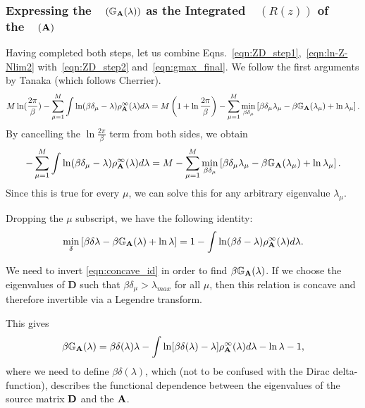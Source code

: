 \subsubsection{Expressing the~\GEN~$(\mathbb{G}_{\mathbf{A}}(\lambda))$ as the Integrated~\RTransform~$(R(z))$ of the~\CorrelationMatrix~$(\mathbf{A})$}
\label{sxn:tanaka_end}
Having completed both steps, let us combine Eqns.~\ref{eqn:ZD_step1},~\ref{eqn:ln-Z-Nlim2}
with~\ref{eqn:ZD_step2} and~\ref{eqn:gmax_final}.
We follow the first arguments by Tanaka\cite{Tanaka2007} (which follows Cherrier\cite{Cherrier2003}).
\begin{align}
   M\ln(\dfrac{{2}\pi}{\beta})-\sum_{\mu=1}^{M}\int \ln(\beta\delta_{\mu}-\lambda)\rho^{\infty}_{\mathbf{A}}(\lambda)d\lambda
      = M \left( 1 + \ln \frac{2\pi}{\beta} \right) - \sum_{\mu=1}^{M} \min_{\beta\delta_{\mu}} \left[\beta\delta_{\mu}\lambda_{\mu}
      - \beta\mathbb{G}_{\mathbf{A}}(\lambda_{\mu}) + \ln \lambda_{\mu} \right]   .
\end{align}
By cancelling the $\ln \frac{2\pi}{\beta}$ term from both sides, we obtain
\begin{align}
   -\sum_{\mu=1}^{M}\int \ln(\beta\delta_{\mu}-\lambda)\rho^{\infty}_{\mathbf{A}}(\lambda)d\lambda
   =
   M - \sum_{\mu=1}^{M} \min_{\beta\delta_{\mu}} \left[\beta\delta_{\mu}\lambda_{\mu}
   - \beta\mathbb{G}_{\mathbf{A}}(\lambda_{\mu}) + \ln \lambda_{\mu} \right]   .
\end{align}
Since this is true for every $\mu$, we can solve this for any arbitrary eigenvalue $\lambda_{\mu}$.

Dropping the $\mu$ subscript, we have the following identity:
\begin{align}
\label{eqn:concave_id} 
 \min_{\delta} \left[\beta\delta\lambda - \beta\mathbb{G}_{\mathbf{A}}(\lambda) + \ln \lambda \right]
 = 1 -\int \ln(\beta\delta-\lambda)\rho^{\infty}_{\mathbf{A}}(\lambda)d\lambda   .
\end{align}

We need to invert \ref{eqn:concave_id} in order to find $\beta\mathbb{G}_{\mathbf{A}}(\lambda)$.
If we choose the eigenvalues of $\mathbf{D}$ such that $\beta\delta_{\mu}>\lambda_{max}$ for all $\mu$, then 
this relation is concave and therefore invertible via a Legendre transform.  

This gives
\begin{equation}
\beta\mathbb{G}_{\mathbf{A}}(\lambda) = \beta\delta(\lambda) \lambda - \int \ln[\beta\delta(\lambda) - \lambda] \rho^{\infty}_{\mathbf{A}}(\lambda) d\lambda - \ln \lambda - 1  ,
\end{equation}
where we need to  define  $ \beta\delta(\lambda)$, which (not to be confused with the Dirac delta-function), describes
the functional dependence between the eigenvalues of the source matrix $\mathbf{D}$ and the \Student \CorrelationMatrix $\mathbf{A}$.

